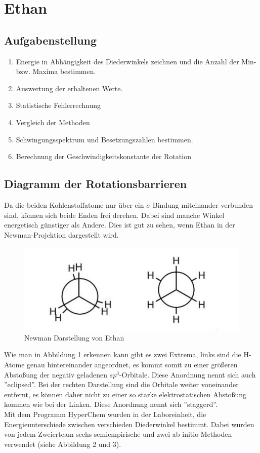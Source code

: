 \section{Ethan}

\subsection{Aufgabenstellung}

\begin{enumerate}
    \item Energie in Abhängigkeit des Diederwinkels zeichnen und die Anzahl der Min- bzw. Maxima bestimmen.
    \item Auswertung der erhaltenen Werte.
    \item Statistische Fehlerrechnung
    \item Vergleich der Methoden 
    \item Schwingungsspektrum und Besetzungszahlen bestimmen.
    \item Berechnung der Geschwindigkeitskonstante der Rotation 
\end{enumerate}

\subsection{Diagramm der Rotationsbarrieren}
Da die beiden Kohlenstoffatome nur über ein $\sigma$-Bindung miteinander verbunden sind, können sich beide Enden frei derehen. Dabei sind 
manche Winkel energetisch günstiger als Andere. Dies ist gut zu sehen, wenn Ethan in der Newman-Projektion dargestellt wird.

\begin{figure}[H]
    \centering
    \includegraphics[scale=.7]{../src/img/newmanEthan.png}
    \caption{Newman Darstellung von Ethan}
\end{figure}


Wie man in Abbildung 1 erkennen kann gibt es zwei Extrema, links sind die H-Atome genau hintereinander angeordnet, es kommt somit zu einer größeren
Abstoßung der negativ geladenen $sp^3$-Orbitale. Diese Anordnung nennt sich auch ''eclipsed''. Bei der rechten Darstellung sind die Orbitale weiter
voneinander entfernt, es können daher nicht zu einer so starke elektrostatischen Abstoßung kommen wie bei der Linken. Diese Anordnung nennt sich ''staggerd''.\\
Mit dem Programm HyperChem wurden in der Laboreinheit, die Energieunterschiede zwischen verschieden Diederwinkel bestimmt. Dabei wurden
von jedem Zweierteam sechs semiempirische und zwei ab-initio Methoden verwendet (siehe Abbildung 2 und 3).


